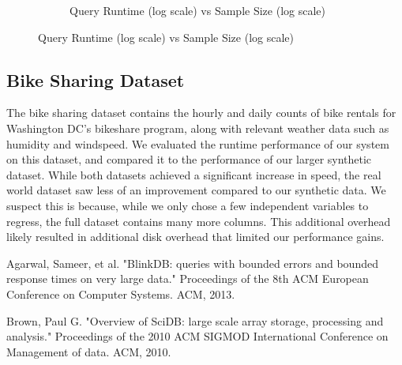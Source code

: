 \documentclass[twoside]{article}
\begin{document}
\begin{figure}[htb]
\begin{subfigure}{0.45\textwidth}
                \caption{Query Runtime (log scale) vs Sample Size (log scale)}
                \label{fig:runtime}
        \end{subfigure}
\end{figure}

\subsection{Bike Sharing Dataset}
The bike sharing dataset contains the hourly and daily counts of bike rentals for Washington DC's bikeshare program, along with relevant weather data such as humidity and windspeed. We evaluated the runtime performance of our system on this dataset, and compared it to the performance of our larger synthetic dataset. While both datasets achieved a significant increase in speed, the real world dataset saw less of an improvement compared to our synthetic data. We suspect this is because, while we only chose a few independent variables to regress, the full dataset contains many more columns. This additional overhead likely resulted in additional disk overhead that limited our performance gains.


\begin{thebibliography}{99} %

Agarwal, Sameer, et al. "BlinkDB: queries with bounded errors and bounded response times on very large data." Proceedings of the 8th ACM European Conference on Computer Systems. ACM, 2013.

Brown, Paul G. "Overview of SciDB: large scale array storage, processing and analysis." Proceedings of the 2010 ACM SIGMOD International Conference on Management of data. ACM, 2010.
 
\end{thebibliography}

\end{document}
